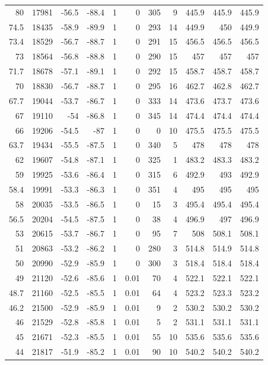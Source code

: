 \documentclass{article}
\begin{document}
\begin{longtable}{|r|r|r|r|r|r|r|r|r|r|r}
80 & 17981 & -56.5 & -88.4 & 1 & 0 & 305 & 9 & 445.9 & 445.9 & 445.9 \\
74.5 & 18435 & -58.9 & -89.9 & 1 & 0 & 293 & 14 & 449.9 & 450 & 449.9 \\
73.4 & 18529 & -56.7 & -88.7 & 1 & 0 & 291 & 15 & 456.5 & 456.5 & 456.5 \\
73 & 18564 & -56.8 & -88.8 & 1 & 0 & 290 & 15 & 457 & 457 & 457 \\
71.7 & 18678 & -57.1 & -89.1 & 1 & 0 & 292 & 15 & 458.7 & 458.7 & 458.7 \\
70 & 18830 & -56.7 & -88.7 & 1 & 0 & 295 & 16 & 462.7 & 462.8 & 462.7 \\
67.7 & 19044 & -53.7 & -86.7 & 1 & 0 & 333 & 14 & 473.6 & 473.7 & 473.6 \\
67 & 19110 & -54 & -86.8 & 1 & 0 & 345 & 14 & 474.4 & 474.4 & 474.4 \\
66 & 19206 & -54.5 & -87 & 1 & 0 & 0 & 10 & 475.5 & 475.5 & 475.5 \\
63.7 & 19434 & -55.5 & -87.5 & 1 & 0 & 340 & 5 & 478 & 478 & 478 \\
62 & 19607 & -54.8 & -87.1 & 1 & 0 & 325 & 1 & 483.2 & 483.3 & 483.2 \\
59 & 19925 & -53.6 & -86.4 & 1 & 0 & 315 & 6 & 492.9 & 493 & 492.9 \\
58.4 & 19991 & -53.3 & -86.3 & 1 & 0 & 351 & 4 & 495 & 495 & 495 \\
58 & 20035 & -53.5 & -86.5 & 1 & 0 & 15 & 3 & 495.4 & 495.4 & 495.4 \\
56.5 & 20204 & -54.5 & -87.5 & 1 & 0 & 38 & 4 & 496.9 & 497 & 496.9 \\
53 & 20615 & -53.7 & -86.7 & 1 & 0 & 95 & 7 & 508 & 508.1 & 508.1 \\
51 & 20863 & -53.2 & -86.2 & 1 & 0 & 280 & 3 & 514.8 & 514.9 & 514.8 \\
50 & 20990 & -52.9 & -85.9 & 1 & 0 & 300 & 3 & 518.4 & 518.4 & 518.4 \\
49 & 21120 & -52.6 & -85.6 & 1 & 0.01 & 70 & 4 & 522.1 & 522.1 & 522.1 \\
48.7 & 21160 & -52.5 & -85.5 & 1 & 0.01 & 64 & 4 & 523.2 & 523.3 & 523.2 \\
46.2 & 21500 & -52.9 & -85.9 & 1 & 0.01 & 9 & 2 & 530.2 & 530.2 & 530.2 \\
46 & 21529 & -52.8 & -85.8 & 1 & 0.01 & 5 & 2 & 531.1 & 531.1 & 531.1 \\
45 & 21671 & -52.3 & -85.5 & 1 & 0.01 & 55 & 10 & 535.6 & 535.6 & 535.6 \\
44 & 21817 & -51.9 & -85.2 & 1 & 0.01 & 90 & 10 & 540.2 & 540.2 & 540.2 \\

\end{longtable}
\end{document}
